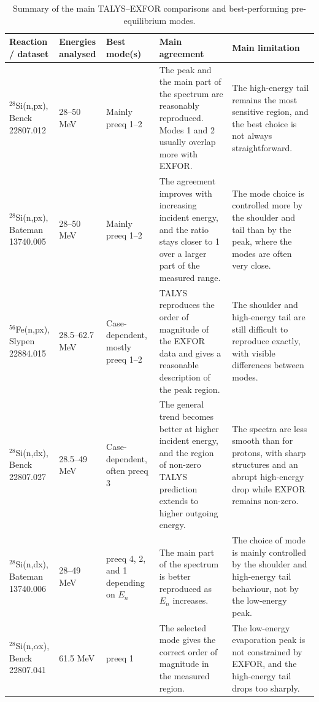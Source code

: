 \begin{table}[h!]
\centering
\small
\begin{tabular}{p{2.8cm} p{1.9cm} p{2.0cm} p{3.4cm} p{3.7cm}}
\hline
\textbf{Reaction / dataset} & \textbf{Energies analysed} & \textbf{Best mode(s)} & \textbf{Main agreement} & \textbf{Main limitation} \\
\hline

$^{28}$Si(n,px), Benck 22807.012 
& 28--50 MeV 
& Mainly preeq 1--2 
& The peak and the main part of the spectrum are reasonably reproduced. Modes 1 and 2 usually overlap more with EXFOR. 
& The high-energy tail remains the most sensitive region, and the best choice is not always straightforward. \\

$^{28}$Si(n,px), Bateman 13740.005 
& 28--50 MeV 
& Mainly preeq 1--2 
& The agreement improves with increasing incident energy, and the ratio stays closer to 1 over a larger part of the measured range. 
& The mode choice is controlled more by the shoulder and tail than by the peak, where the modes are often very close. \\

$^{56}$Fe(n,px), Slypen 22884.015 
& 28.5--62.7 MeV 
& Case-dependent, mostly preeq 1--2 
& TALYS reproduces the order of magnitude of the EXFOR data and gives a reasonable description of the peak region. 
& The shoulder and high-energy tail are still difficult to reproduce exactly, with visible differences between modes. \\

$^{28}$Si(n,dx), Benck 22807.027 
& 28.5--49 MeV 
& Case-dependent, often preeq 3 
& The general trend becomes better at higher incident energy, and the region of non-zero TALYS prediction extends to higher outgoing energy. 
& The spectra are less smooth than for protons, with sharp structures and an abrupt high-energy drop while EXFOR remains non-zero. \\

$^{28}$Si(n,dx), Bateman 13740.006 
& 28--49 MeV 
& preeq 4, 2, and 1 depending on $E_n$ 
& The main part of the spectrum is better reproduced as $E_n$ increases. 
& The choice of mode is mainly controlled by the shoulder and high-energy tail behaviour, not by the low-energy peak. \\

$^{28}$Si(n,$\alpha$x), Benck 22807.041 
& 61.5 MeV 
& preeq 1 
& The selected mode gives the correct order of magnitude in the measured region. 
& The low-energy evaporation peak is not constrained by EXFOR, and the high-energy tail drops too sharply. \\

\hline
\end{tabular}
\caption{Summary of the main TALYS--EXFOR comparisons and best-performing pre-equilibrium modes.}
\label{tab:summary_results}
\end{table}
